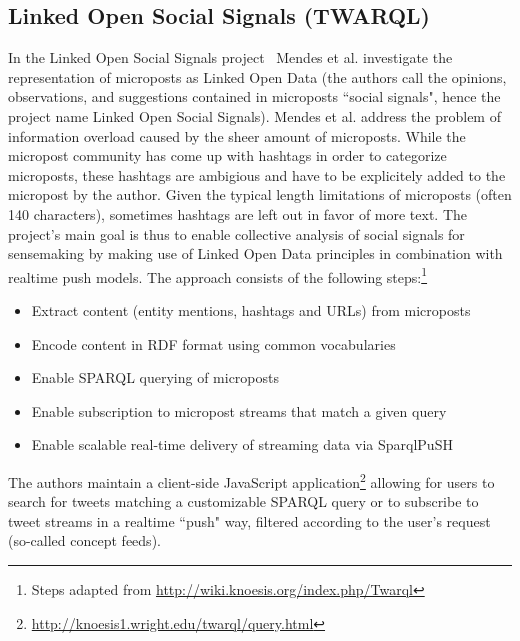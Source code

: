 \documentclass[runningheads,a4paper]{llncs}
\begin{document}
\subsection{Linked Open Social Signals (TWARQL)}
In the Linked Open Social Signals project~\cite{Mendes:LOSS} Mendes et al. investigate the representation of microposts as Linked Open Data (the authors call the opinions, observations, and suggestions contained in microposts ``social signals", hence the project name Linked Open Social Signals). Mendes et al. address the problem of information overload caused by the sheer amount of microposts. While the micropost community has come up with hashtags in order to categorize microposts, these hashtags are ambigious and have to be explicitely added to the micropost by the author. Given the typical length limitations of microposts (often 140 characters), sometimes hashtags are left out in favor of more text. The project's main goal is thus to enable collective analysis of social signals for sensemaking by making use of Linked Open Data principles in combination with realtime push models. The approach consists of the following steps:\footnote{Steps adapted from \url{http://wiki.knoesis.org/index.php/Twarql}} 
\begin{itemize}
\item Extract content (entity mentions, hashtags and URLs) from microposts
\item Encode content in RDF format using common vocabularies
\item Enable SPARQL querying of microposts
\item Enable subscription to micropost streams that match a given query
\item Enable scalable real-time delivery of streaming data via SparqlPuSH
\end{itemize}
The authors maintain a client-side JavaScript application\footnote{\url{http://knoesis1.wright.edu/twarql/query.html}} allowing for users to search for tweets matching a customizable SPARQL query or to subscribe to tweet streams in a realtime ``push" way, filtered according to the user's request (so-called concept feeds).
\end{document}
